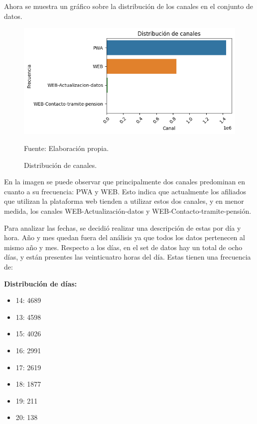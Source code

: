 Ahora se muestra un gráfico sobre la distribución de los canales en el conjunto de datos.

\begin{figure}[H]
    \begin{minipage}[t]{0.9\textwidth}
        \caption{Distribución de canales.}
        \label{descripcion_dataframe}        
    \end{minipage}

    \vspace{10pt}

    \begin{minipage}[b]{0.85\textwidth}
        \centering
        \includegraphics[width=\textwidth]{img/visualizacion-canales.png}        
    \end{minipage}

    \begin{minipage}[t]{0.9\textwidth}
        Fuente: Elaboración propia.
    \end{minipage}
\end{figure}

En la imagen se puede observar que principalmente dos canales predominan en cuanto a su frecuencia: PWA y WEB. Esto indica que actualmente los afiliados que utilizan la plataforma web tienden a utilizar estos dos canales, y en menor medida, los canales WEB-Actualización-datos y WEB-Contacto-tramite-pensión.

Para analizar las fechas, se decidió realizar una descripción de estas por día y hora. Año y mes quedan fuera del análisis ya que todos los datos pertenecen al mismo año y mes. Respecto a los días, en el set de datos hay un total de ocho días, y están presentes las veinticuatro horas del día. Estas tienen una frecuencia de:

\textbf{Distribución de días:}
\begin{itemize}
    \item 14: 4689
    \item 13: 4598
    \item 15: 4026
    \item 16: 2991
    \item 17: 2619
    \item 18: 1877
    \item 19: 211
    \item 20: 138
\end{itemize}

